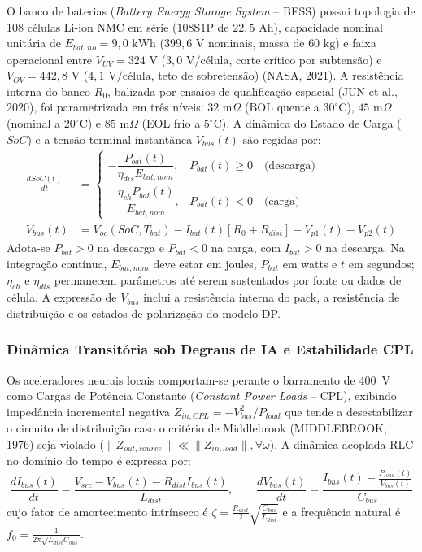 O banco de baterias (\textit{Battery Energy Storage System} -- BESS) possui topologia de 108 células Li-ion NMC em série ($108\text{S}1\text{P}$ de $22{,}5\text{ Ah}$), capacidade nominal unitária de $E_{bat,no} = 9{,}0\text{ kWh}$ ($399{,}6\text{ V}$ nominais, massa de $60\text{ kg}$) e faixa operacional entre $V_{UV} = 324\text{ V}$ ($3{,}0\text{ V/célula}$, corte crítico por subtensão) e $V_{OV} = 442{,}8\text{ V}$ ($4{,}1\text{ V/célula}$, teto de sobretensão) (NASA, 2021). A resistência interna do banco $R_0$, balizada por ensaios de qualificação espacial (JUN et al., 2020), foi parametrizada em três níveis: $32\text{ m}\Omega$ (BOL quente a $30^\circ\text{C}$), $45\text{ m}\Omega$ (nominal a $20^\circ\text{C}$) e $85\text{ m}\Omega$ (EOL frio a $5^\circ\text{C}$). A dinâmica do Estado de Carga ($SoC$) e a tensão terminal instantânea $V_{bus}(t)$ são regidas por:
\begin{align}
    \frac{dSoC(t)}{dt} &= \begin{cases} -\dfrac{P_{bat}(t)}{\eta_{dis} E_{bat,nom}}, & P_{bat}(t) \ge 0 \quad \text{(descarga)} \\[0.2cm] -\dfrac{\eta_{ch} P_{bat}(t)}{E_{bat,nom}}, & P_{bat}(t) < 0 \quad \text{(carga)} \end{cases} \label{eq:bess_dinamica} \\
    V_{bus}(t) &= V_{oc}(SoC,T_{bat}) - I_{bat}(t)\left[R_0+R_{dist}\right] - V_{p1}(t)-V_{p2}(t) \label{eq:vbus_bess_dinamica}
\end{align}
Adota-se $P_{bat}>0$ na descarga e $P_{bat}<0$ na carga, com $I_{bat}>0$ na descarga. Na integração contínua, $E_{bat,nom}$ deve estar em joules, $P_{bat}$ em watts e $t$ em segundos; $\eta_{ch}$ e $\eta_{dis}$ permanecem parâmetros até serem sustentados por fonte ou dados de célula. A expressão de $V_{bus}$ inclui a resistência interna do pack, a resistência de distribuição e os estados de polarização do modelo DP.

\subsubsection{Dinâmica Transitória sob Degraus de IA e Estabilidade CPL}

Os aceleradores neurais locais comportam-se perante o barramento de 400~V como Cargas de Potência Constante (\textit{Constant Power Loads} -- CPL), exibindo impedância incremental negativa $Z_{in,CPL} = -V_{bus}^2 / P_{load}$ que tende a desestabilizar o circuito de distribuição caso o critério de Middlebrook (MIDDLEBROOK, 1976) seja violado ($\|Z_{out,source}\| \ll \|Z_{in,load}\|, \forall \omega$). A dinâmica acoplada RLC no domínio do tempo é expressa por:
\begin{equation}
    \frac{dI_{bus}(t)}{dt} = \frac{V_{src} - V_{bus}(t) - R_{dist} I_{bus}(t)}{L_{dist}}, \qquad \frac{dV_{bus}(t)}{dt} = \frac{I_{bus}(t) - \frac{P_{load}(t)}{V_{bus}(t)}}{C_{bus}}
    \label{eq:rlc_estado}
\end{equation}
cujo fator de amortecimento intrínseco é $\zeta = \frac{R_{dist}}{2}\sqrt{\frac{C_{bus}}{L_{dist}}}$ e a frequência natural é $f_0 = \frac{1}{2\pi \sqrt{L_{dist} C_{bus}}}$.

